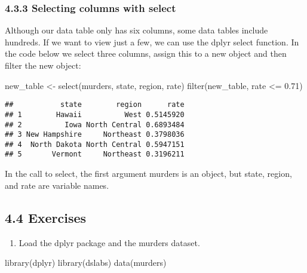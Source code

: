 \documentclass[
]{article}
\newenvironment{Shaded}{\begin{snugshade}}{\end{snugshade}}
\newcommand{\FloatTok}[1]{\textcolor[rgb]{0.00,0.00,0.81}{#1}}
\newcommand{\FunctionTok}[1]{\textcolor[rgb]{0.00,0.00,0.00}{#1}}
\newcommand{\NormalTok}[1]{#1}
\newcommand{\OtherTok}[1]{\textcolor[rgb]{0.56,0.35,0.01}{#1}}
\newcommand{\SpecialCharTok}[1]{\textcolor[rgb]{0.00,0.00,0.00}{#1}}
\providecommand{\tightlist}{%
  \setlength{\itemsep}{0pt}\setlength{\parskip}{0pt}}
\begin{document}
\hypertarget{selecting-columns-with-select}{%
\subsubsection{4.3.3 Selecting columns with
select}\label{selecting-columns-with-select}}

Although our data table only has six columns, some data tables include
hundreds. If we want to view just a few, we can use the dplyr select
function. In the code below we select three columns, assign this to a
new object and then filter the new object:

\begin{Shaded}
\begin{Highlighting}[]
\NormalTok{new\_table }\OtherTok{\textless{}{-}} \FunctionTok{select}\NormalTok{(murders, state, region, rate)}
\FunctionTok{filter}\NormalTok{(new\_table, rate }\SpecialCharTok{\textless{}=} \FloatTok{0.71}\NormalTok{)}
\end{Highlighting}
\end{Shaded}

\begin{verbatim}
##           state        region      rate
## 1        Hawaii          West 0.5145920
## 2          Iowa North Central 0.6893484
## 3 New Hampshire     Northeast 0.3798036
## 4  North Dakota North Central 0.5947151
## 5       Vermont     Northeast 0.3196211
\end{verbatim}

In the call to select, the first argument murders is an object, but
state, region, and rate are variable names.

\hypertarget{exercises-1}{%
\subsection{4.4 Exercises}\label{exercises-1}}

\begin{enumerate}
\def\labelenumi{\arabic{enumi}.}
\tightlist
\item
  Load the dplyr package and the murders dataset.
\end{enumerate}

\begin{Shaded}
\begin{Highlighting}[]
\FunctionTok{library}\NormalTok{(dplyr)}
\FunctionTok{library}\NormalTok{(dslabs)}
\FunctionTok{data}\NormalTok{(murders)}
\end{Highlighting}
\end{Shaded}
\end{document}
